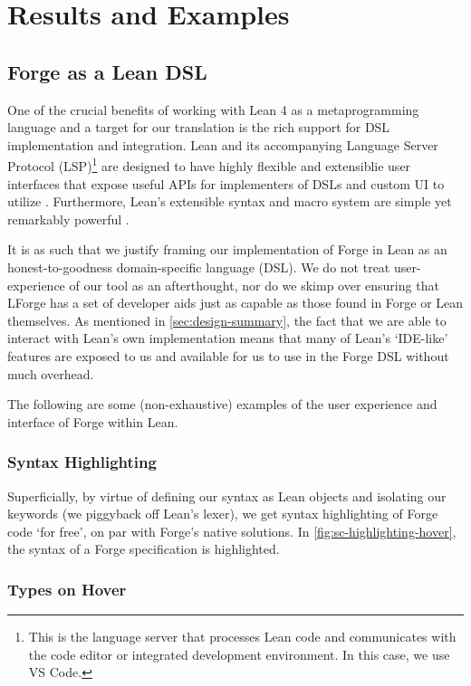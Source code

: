 \section{Results and Examples}

\subsection{Forge as a Lean DSL}
One of the crucial benefits of working with Lean 4 as a metaprogramming language and a target for our translation is the rich support for DSL implementation and integration. Lean and its accompanying Language Server Protocol (LSP)\footnote{This is the language server that processes Lean code and communicates with the code editor or integrated development environment. In this case, we use VS Code.} are designed to have highly flexible and extensiblie user interfaces that expose useful APIs for implementers of DSLs and custom UI to utilize \cite{moura2021lean, nawrocki2023extensible}. Furthermore, Lean's extensible syntax and macro system are simple yet remarkably powerful \cite{ullrich2022beyond, metaprogramming}. 

It is as such that we justify framing our implementation of Forge in Lean as an honest-to-goodness domain-specific language (DSL). We do not treat user-experience of our tool as an afterthought, nor do we skimp over ensuring that LForge has a set of developer aids just as capable as those found in Forge or Lean themselves. As mentioned in \cref{sec:design-summary}, the fact that we are able to interact with Lean's own implementation means that many of Lean's `IDE-like' features are exposed to us and available for us to use in the Forge DSL without much overhead. 

The following are some (non-exhaustive) examples of the user experience and interface of Forge within Lean. 

\subsubsection{Syntax Highlighting}

Superficially, by virtue of defining our syntax as Lean objects and isolating our keywords (we piggyback off Lean's lexer), we get syntax highlighting of Forge code `for free', on par with Forge's native solutions. In \cref{fig:sc-highlighting-hover}, the syntax of a Forge specification is highlighted. 

\subsubsection{Types on Hover}

